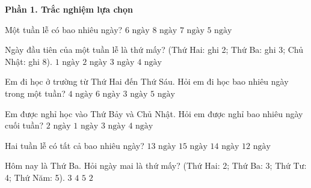 \textbf{Phần 1. Trắc nghiệm lựa chọn}

\begin{ex} %
Một tuần lễ có bao nhiêu ngày?
\choice
{$6\text{ ngày}$}
{$8\text{ ngày}$}
{\True $7\text{ ngày}$}
{$5\text{ ngày}$}
\end{ex}

\begin{ex} %
Ngày đầu tiên của một tuần lễ là thứ mấy? (Thứ Hai: ghi 2; Thứ Ba: ghi 3; Chủ Nhật: ghi 8).
\choice
{$1\text{ ngày}$}
{\True $2\text{ ngày}$}
{$3\text{ ngày}$}
{$4\text{ ngày}$}
\end{ex}

\begin{ex} %
Em đi học ở trường từ Thứ Hai đến Thứ Sáu. Hỏi em đi học bao nhiêu ngày trong một tuần?
\choice
{$4\text{ ngày}$}
{$6\text{ ngày}$}
{$3\text{ ngày}$}
{\True $5\text{ ngày}$}
\end{ex}

\begin{ex} %
Em được nghỉ học vào Thứ Bảy và Chủ Nhật. Hỏi em được nghỉ bao nhiêu ngày cuối tuần?
\choice
{\True $2\text{ ngày}$}
{$1\text{ ngày}$}
{$3\text{ ngày}$}
{$4\text{ ngày}$}
\end{ex}

\begin{ex} %
Hai tuần lễ có tất cả bao nhiêu ngày?
\choice
{$13\text{ ngày}$}
{$15\text{ ngày}$}
{\True $14\text{ ngày}$}
{$12\text{ ngày}$}
\end{ex}

\begin{ex} %
Hôm nay là Thứ Ba. Hỏi ngày mai là thứ mấy? (Thứ Hai: 2; Thứ Ba: 3; Thứ Tư: 4; Thứ Năm: 5).
\choice
{$3$}
{\True $4$}
{$5$}
{$2$}
\end{ex}

